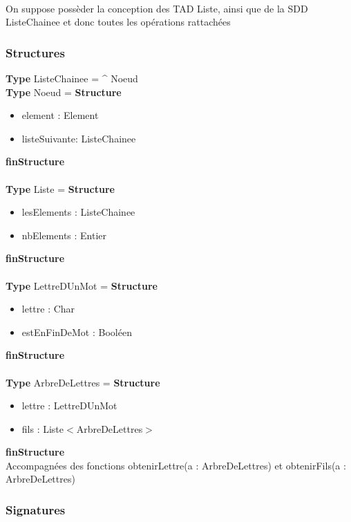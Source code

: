 \documentclass{article}
\begin{document}
    \pagestyle{empty}
    \noindent
    \\
    On suppose possèder la conception des TAD Liste, ainsi que de la SDD ListeChainee et donc toutes les opérations rattachées
    \\
    \subsubsection*{Structures}
    \textbf{Type} ListeChainee = \^ \- Noeud \\
    \textbf{Type} Noeud = \textbf{Structure}
	\begin{itemize}[label=$\ $, leftmargin=2cm]
		 \item element : Element
		 \item listeSuivante: ListeChainee
	\end{itemize}
    \textbf{finStructure}
    \\
    \\
    \textbf{Type} Liste = \textbf{Structure}
	\begin{itemize}[label=$\ $, leftmargin=2cm]
		 \item lesElements : ListeChainee
		 \item nbElements : Entier
    \end{itemize}
    \textbf{finStructure} \\
    \\
    \textbf{Type} LettreDUnMot = \textbf{Structure}
	\begin{itemize}[label=$\ $, leftmargin=2cm]
		 \item lettre : Char
		 \item estEnFinDeMot : Booléen
	\end{itemize}
    \textbf{finStructure}
    \\
    \\
    \textbf{Type} ArbreDeLettres = \textbf{Structure}
	\begin{itemize}[label=$\ $, leftmargin=2cm]
		 \item lettre : LettreDUnMot
		 \item fils : Liste$<$ArbreDeLettres$>$
	\end{itemize}
    \textbf{finStructure}\\
    Accompagnées des fonctions obtenirLettre(a : ArbreDeLettres) et obtenirFils(a : ArbreDeLettres)
    
    
    \subsubsection*{Signatures}
\end{document}
